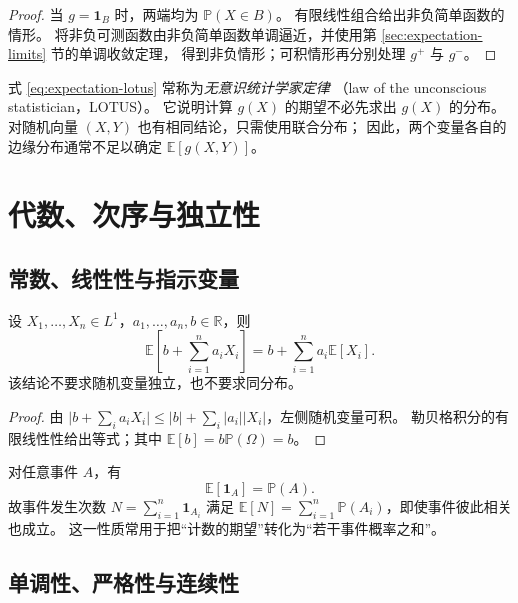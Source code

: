 \documentclass[UTF8,12pt,a4paper,fontset=fandol]{ctexart}
\begin{document}
\begin{proof}
当 $g=\mathbf1_B$ 时，两端均为 $\mathbb P(X\in B)$。
有限线性组合给出非负简单函数的情形。
将非负可测函数由非负简单函数单调逼近，并使用第 \ref{sec:expectation-limits} 节的单调收敛定理，
得到非负情形；可积情形再分别处理 $g^+$ 与 $g^-$。
\end{proof}

式 \eqref{eq:expectation-lotus} 常称为\emph{无意识统计学家定律}
（law of the unconscious statistician，LOTUS）。
它说明计算 $g(X)$ 的期望不必先求出 $g(X)$ 的分布。
对随机向量 $(X,Y)$ 也有相同结论，只需使用联合分布；
因此，两个变量各自的边缘分布通常不足以确定 $\mathbb E[g(X,Y)]$。

\section{代数、次序与独立性}
\label{sec:expectation-algebra}

\subsection{常数、线性性与指示变量}

\begin{proposition}[有限线性性]
\label{prop:expectation-linearity}
设 $X_1,\ldots,X_n\in L^1$，$a_1,\ldots,a_n,b\in\mathbb R$，则
\begin{equation}
  \mathbb E\!\left[b+\sum_{i=1}^n a_iX_i\right]
  =b+\sum_{i=1}^n a_i\mathbb E[X_i].
  \label{eq:expectation-linearity}
\end{equation}
该结论不要求随机变量独立，也不要求同分布。
\end{proposition}

\begin{proof}
由 $\bigl|b+\sum_i a_iX_i\bigr|\leq |b|+\sum_i|a_i||X_i|$，左侧随机变量可积。
勒贝格积分的有限线性性给出等式；其中 $\mathbb E[b]=b\mathbb P(\Omega)=b$。
\end{proof}

对任意事件 $A$，有
\begin{equation}
  \mathbb E[\mathbf1_A]=\mathbb P(A).
  \label{eq:expectation-indicator}
\end{equation}
故事件发生次数 $N=\sum_{i=1}^n\mathbf1_{A_i}$ 满足
$\mathbb E[N]=\sum_{i=1}^n\mathbb P(A_i)$，即使事件彼此相关也成立。
这一性质常用于把“计数的期望”转化为“若干事件概率之和”。

\subsection{单调性、严格性与连续性}
\end{document}

